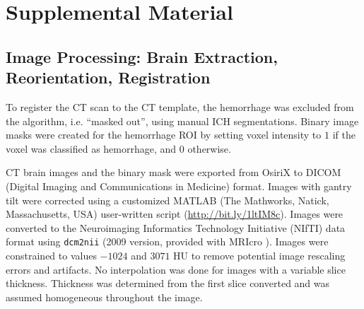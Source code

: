 \documentclass[10pt]{article}\usepackage[]{graphicx}\usepackage[]{color}
\begin{document}






\newpage
\section{Supplemental Material}

\subsection{Image Processing: Brain Extraction, Reorientation, Registration}
\label{sec:processing}
To register the CT scan to the CT template, the hemorrhage was excluded from the algorithm, i.e. ``masked out'', using manual ICH segmentations.  Binary image masks were created for the hemorrhage ROI by setting voxel intensity to $1$ if the voxel was classified as hemorrhage, and $0$ otherwise.  

CT brain images and the binary mask were exported from OsiriX to DICOM (Digital Imaging and Communications in Medicine) format.  Images with gantry tilt were corrected using a customized MATLAB (The Mathworks, Natick, Massachusetts, USA) user-written script (\url{http://bit.ly/1ltIM8c}). 
Images were converted to the Neuroimaging Informatics Technology Initiative (NIfTI) data format using \verb|dcm2nii| (2009 version, provided with MRIcro \citep{rorden_stereotaxic_2000}).  Images were constrained to values $-1024$ and $3071$ HU to remove potential image rescaling errors and artifacts.  No interpolation was done for images with a variable slice thickness. Thickness was determined from the first slice converted and was assumed homogeneous throughout the image.  
\end{document}
